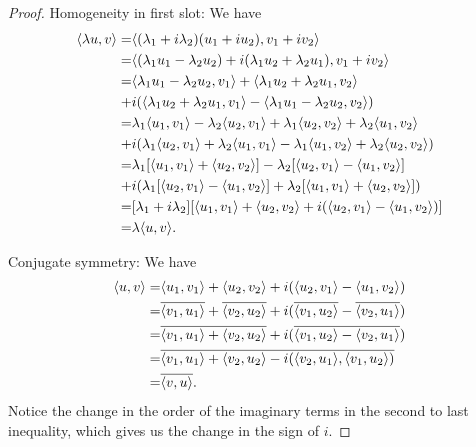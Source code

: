 \begin{proof}
 Homogeneity in first slot: We have
 \begin{align*}
     \langle \lambda u,v\rangle =& \langle (\lambda_1+i\lambda_2)(u_1+iu_2), v_1+iv_2\rangle\\
     =& \langle (\lambda_1u_1-\lambda_2u_2)+i(\lambda_1u_2+\lambda_2u_1), v_1+iv_2\rangle\\
     =& \langle \lambda_1u_1-\lambda_2u_2, v_1\rangle + 
     \langle \lambda_1u_2+\lambda_2u_1, v_2\rangle\\
     +& i(\langle \lambda_1u_2+\lambda_2u_1, v_1\rangle - \langle \lambda_1u_1-\lambda_2u_2, v_2\rangle)\\
     =& \lambda_1\langle u_1,v_1\rangle-\lambda_2\langle u_2, v_1\rangle + 
     \lambda_1\langle u_2, v_2\rangle+\lambda_2\langle u_1, v_2\rangle\\
     +& i(\lambda_1\langle u_2, v_1\rangle+\lambda_2\langle u_1, v_1\rangle - \lambda_1\langle u_1, v_2\rangle+\lambda_2\langle u_2, v_2\rangle)\\
     =& \lambda_1[\langle u_1,v_1\rangle+\langle u_2, v_2\rangle]-\lambda_2[\langle u_2, v_1\rangle-\langle u_1, v_2\rangle]\\
     +& i(\lambda_1[\langle u_2, v_1\rangle-\langle u_1, v_2\rangle] + \lambda_2[\langle u_1, v_1\rangle+\langle u_2, v_2\rangle])\\
     =& [\lambda_1+i\lambda_2][\langle u_1,v_1\rangle+\langle u_2,v_2\rangle+i(\langle u_2,v_1\rangle-\langle u_1,v_2\rangle)]\\
     =& \lambda\langle u,v\rangle.
\end{align*}

Conjugate symmetry: We have
\begin{align*}
    \langle u,v\rangle =& \langle u_1,v_1\rangle+\langle u_2,v_2\rangle
    + i(\langle u_2,v_1\rangle-\langle u_1,v_2\rangle)\\
    =& \overline{\langle v_1,u_1\rangle}+\overline{\langle v_2,u_2\rangle}
    + i(\overline{\langle v_1,u_2\rangle}-\overline{\langle v_2,u_1\rangle})\\
    =& \overline{\langle v_1,u_1\rangle+\langle v_2,u_2\rangle}
    + i(\overline{\langle v_1,u_2\rangle-\langle v_2,u_1\rangle})\\
    =& \overline{\langle v_1,u_1\rangle+\langle v_2,u_2\rangle
    - i(\langle v_2,u_1\rangle, \langle v_1,u_2\rangle)}\\
    =& \overline{\langle v,u\rangle}.
\end{align*}
Notice the change in the order of the imaginary terms in the second to last inequality, which gives us the change in the sign of $i$.
\end{proof}

